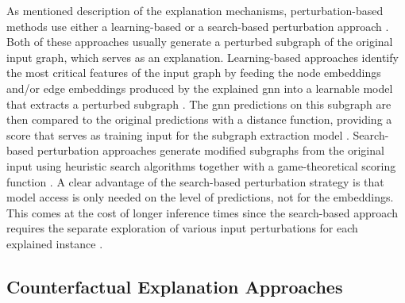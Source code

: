 As mentioned description of the explanation mechanisms, perturbation-based methods use either a learning-based or a search-based perturbation approach \cite{xia_explaining_2023}. Both of these approaches usually generate a perturbed subgraph of the original input graph, which serves as an explanation. Learning-based approaches identify the most critical features of the input graph by feeding the node embeddings and/or edge embeddings produced by the explained \gls{gnn} into a learnable model that extracts a perturbed subgraph \cite{kakkad_survey_2023, xia_explaining_2023}. The \gls{gnn} predictions on this subgraph are then compared to the original predictions with a distance function, providing a score that serves as training input for the subgraph extraction model \cite{kakkad_survey_2023}. Search-based perturbation approaches generate modified subgraphs from the original input using heuristic search algorithms together with a game-theoretical scoring function \cite{xia_explaining_2023, yuan_explainability_2021}. A clear advantage of the search-based perturbation strategy is that model access is only needed on the level of predictions, not for the embeddings. This comes at the cost of longer inference times \cite{xia_explaining_2023} since the search-based approach requires the separate exploration of various input perturbations for each explained instance \cite{yuan_explainability_2021}.



\subsection{Counterfactual Explanation Approaches}
\label{s_ExplainingGNNs_CounterFactual}


